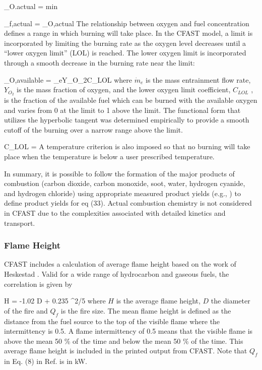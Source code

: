 \be {}_{O.actual} = min  \ee

\be {}_{f,actual} = _{O,actual}   \ee
The relationship between oxygen and fuel concentration defines a range in which burning will
take place.  In the CFAST model, a limit is incorporated by limiting the burning rate as the
oxygen level decreases until a ``lower oxygen limit'' (LOL) is reached. The lower oxygen limit is
incorporated through a smooth decrease in the burning rate near the limit:

\be {}_{O,available} = _eY_{O_2}C_{LOL} \ee
where $\dot{m}_e$ is the mass entrainment flow rate, $Y_{O_2}$ is the mass fraction of oxygen, and the lower oxygen limit coefficient, $C_{LOL}$
, is the fraction of the available fuel which can be burned with the
available oxygen and varies from 0 at the limit to 1 above the limit.  The functional form that
utilizes the hyperbolic tangent was determined empirically to provide a smooth cutoff of the
burning over a narrow range above the limit.

\be C_{LOL} =  \ee
A temperature criterion is also imposed so that no burning will take place when the temperature
is below a user prescribed temperature.

In summary, it is possible to follow the formation of the major products of combustion (carbon
dioxide, carbon monoxide, soot, water, hydrogen cyanide, and hydrogen chloride) using
appropriate measured product yields (e.g., \cite{Morehart:1991}) to define product yields for eq (33). Actual
combustion chemistry is not considered in CFAST due to the complexities associated with
detailed kinetics and transport.

\subsubsection{Flame Height}

CFAST includes a calculation of average flame height based on the work of Heskestad \cite{Heskestad:2002}.
Valid for a wide range of hydrocarbon and gaseous fuels, the correlation is given by

\be H = -1.02 D + 0.235 ^{2/5} \ee
where $H$ is the average flame height, $D$ the diameter of the fire and $Q_f$ is the fire size. The mean
flame height is defined as the distance from the fuel source to the top of the visible flame where
the intermittency is 0.5.  A flame intermittency of 0.5 means that the visible flame is above the
mean 50 \% of the time and below the mean 50 \% of the time.  This average flame height is
 included in the printed output from CFAST. Note that $Q_f$ in Eq. (8) in Ref. \cite{Heskestad:2002} is in kW.

